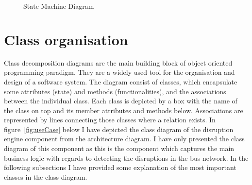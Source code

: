 \begin{figure}
	\caption{State Machine Diagram}
\label{fig:stateMachine}
\end{figure}

\FloatBarrier
\section{Class organisation}
Class decomposition diagrams are the main building block of object oriented programming paradigm. They are a widely used tool for the organisation and design of a software system. The diagram consist of classes, which encapsulate some attributes (state) and methods (functionalities), and the associations between the individual class. Each class is depicted by a box with the name of the class on top and its member attributes and methods below. Associations are represented by lines connecting those classes where a relation exists. In figure~\ref{fig:useCase} below I have depicted the class diagram of the disruption engine component from the architecture diagram. I have only presented the class diagram of this component as this is the component which captures the main business logic with regards to detecting the disruptions in the bus network. In the following subsections I have provided some explanation of the most important classes in the class diagram.

